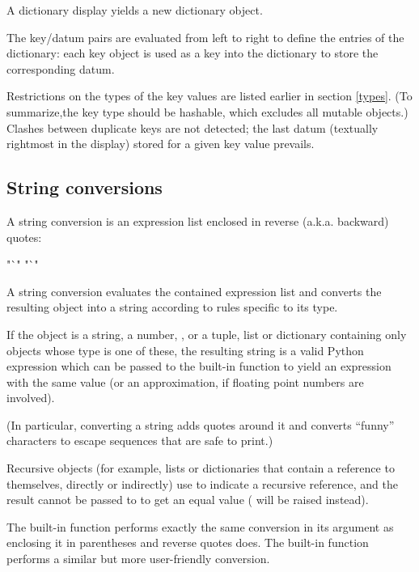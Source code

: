 A dictionary display yields a new dictionary object.

The key/datum pairs are evaluated from left to right to define the
entries of the dictionary: each key object is used as a key into the
dictionary to store the corresponding datum.

Restrictions on the types of the key values are listed earlier in
section \ref{types}.  (To summarize,the key type should be hashable,
which excludes all mutable objects.)  Clashes between duplicate keys
are not detected; the last datum (textually rightmost in the display)
stored for a given key value prevails.


\subsection{String conversions\label{string-conversions}}

A string conversion is an expression list enclosed in reverse (a.k.a.
backward) quotes:

\begin{productionlist}
             {"`"  "`"}
\end{productionlist}

A string conversion evaluates the contained expression list and
converts the resulting object into a string according to rules
specific to its type.

If the object is a string, a number, , or a tuple, list or
dictionary containing only objects whose type is one of these, the
resulting string is a valid Python expression which can be passed to
the built-in function  to yield an expression with the
same value (or an approximation, if floating point numbers are
involved).

(In particular, converting a string adds quotes around it and converts
``funny'' characters to escape sequences that are safe to print.)

Recursive objects (for example, lists or dictionaries that contain a
reference to themselves, directly or indirectly) use  to
indicate a recursive reference, and the result cannot be passed to
 to get an equal value ( will
be raised instead).

The built-in function  performs exactly the same
conversion in its argument as enclosing it in parentheses and reverse
quotes does.  The built-in function  performs a
similar but more user-friendly conversion.


